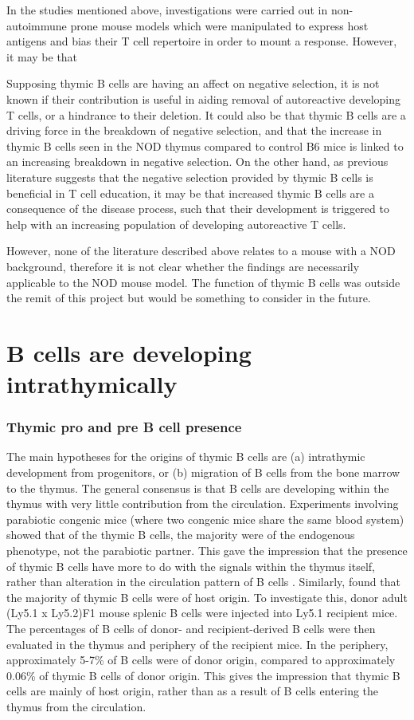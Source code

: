 In the studies mentioned above, investigations were carried out in non-autoimmune prone mouse models which were manipulated to express host antigens and bias their T cell repertoire in order to mount a response.
However, it may be that 

Supposing thymic B cells are having an affect on negative selection, it is not known if their contribution is useful in aiding removal of autoreactive developing T cells, or a hindrance to their deletion.
It could also be that thymic B cells are a driving force in the breakdown of negative selection, and that the increase in thymic B cells seen in the NOD thymus compared to control B6 mice is linked to an increasing breakdown in negative selection.
On the other hand, as previous literature suggests that the negative selection provided by thymic B cells is beneficial in T cell education, it may be that increased thymic B cells are a consequence of the disease process, such that their development is triggered to help with an increasing population of developing autoreactive T cells.

However, none of the literature described above relates to a mouse with a NOD background, therefore it is not clear whether the findings are necessarily applicable to the NOD mouse model.
The function of thymic B cells was outside the remit of this project but would be something to consider in the future. 

\section{B cells are developing intrathymically}

\subsubsection{Thymic pro and pre B cell presence}
The main hypotheses for the origins of thymic B cells are (a) intrathymic development from progenitors, or (b) migration of B cells from the bone marrow to the thymus.
The general consensus is that B cells are developing within the thymus with very little contribution from the circulation.
Experiments involving parabiotic congenic mice (where two congenic mice share the same blood system) showed that of the thymic B cells, the majority were of the endogenous phenotype, not the parabiotic partner. 
This gave the impression that the presence of thymic B cells have more to do with the signals within the thymus itself, rather than alteration in the circulation pattern of B cells \citep{Perera2013}.
Similarly, \citet{Akashi2000} found that the majority of thymic B cells were of host origin.
To investigate this, donor adult (Ly5.1 x Ly5.2)F1 mouse splenic B cells were injected into Ly5.1 recipient mice.
The percentages of B cells of donor- and recipient-derived B cells were then evaluated in the thymus and periphery of the recipient mice.
In the periphery, approximately 5-7\% of B cells were of donor origin, compared to approximately 0.06\% of thymic B cells of donor origin.
This gives the impression that thymic B cells are mainly of host origin, rather than as a result of B cells entering the thymus from the circulation. 

